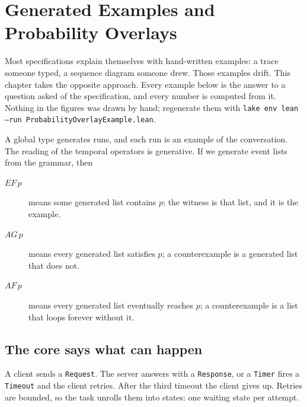 \chapter{Generated Examples and Probability Overlays}
\makeatletter
\newenvironment{herefigure}{\par\medskip\noindent\begin{minipage}{\linewidth}\centering\def\@captype{figure}}{\end{minipage}\par\medskip}
\newenvironment{heretable}{\par\medskip\noindent\begin{minipage}{\linewidth}\centering\def\@captype{table}}{\end{minipage}\par\medskip}
\makeatother
\label{ch:generated-examples}

Most specifications explain themselves with hand-written examples: a trace
someone typed, a sequence diagram someone drew. Those examples drift. This
chapter takes the opposite approach. Every example below is the answer to a
question asked of the specification, and every number is computed from it.
Nothing in the figures was drawn by hand; regenerate them with
\texttt{lake env lean --run ProbabilityOverlayExample.lean}.

A global type generates runs, and each run is an example of the conversation.
The reading of the temporal operators is generative. If we generate event
lists from the grammar, then
\begin{description}
\item[$EF\,p$] means some generated list contains $p$; the witness is that
list, and it is the example.
\item[$AG\,p$] means every generated list satisfies $p$; a counterexample is a
generated list that does not.
\item[$AF\,p$] means every generated list eventually reaches $p$; a
counterexample is a list that loops forever without it.
\end{description}

\section{The core says what can happen}

A client sends a \texttt{Request}. The server answers with a
\texttt{Response}, or a \texttt{Timer} fires a \texttt{Timeout} and the client
retries. After the third timeout the client gives up. Retries are bounded, so
the task unrolls them into states: one waiting state per attempt.

